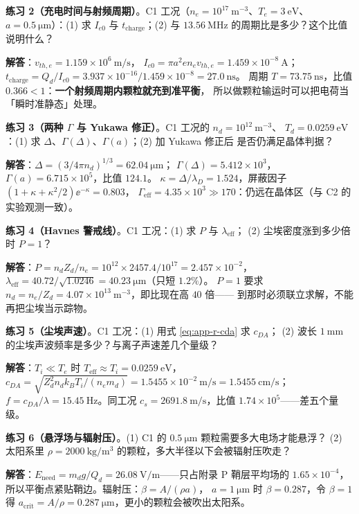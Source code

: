 \textbf{练习 2（充电时间与射频周期）}。C1 工况（$n_e=10^{17}\ \mathrm{m^{-3}}$、$T_e=3\ \mathrm{eV}$、
$a=0.5\ \mathrm{\mu m}$）：(1) 求 $I_{e0}$ 与 $t_{\mathrm{charge}}$；(2) 与 $13.56\ \mathrm{MHz}$
的周期比是多少？这个比值说明什么？

\textbf{解答}：$v_{th,e}=1.159\times10^{6}\ \mathrm{m/s}$，
$I_{e0}=\pi a^2en_ev_{th,e}=1.459\times10^{-8}\ \mathrm{A}$；
$t_{\mathrm{charge}}=Q_d/I_{e0}=3.937\times10^{-16}/1.459\times10^{-8}=27.0\ \mathrm{ns}$。
周期 $T=73.75\ \mathrm{ns}$，比值 $0.366<1$：\textbf{一个射频周期内颗粒就充到准平衡}，
所以做颗粒输运时可以把电荷当「瞬时准静态」处理。

\textbf{练习 3（两种 $\Gamma$ 与 Yukawa 修正）}。C1 工况的 $n_d=10^{12}\ \mathrm{m^{-3}}$、
$T_d=0.0259\ \mathrm{eV}$：(1) 求 $\Delta$、$\Gamma(\Delta)$、$\Gamma(a)$；(2) 加 Yukawa 修正后
是否仍满足晶体判据？

\textbf{解答}：$\Delta=(3/4\pi n_d)^{1/3}=62.04\ \mathrm{\mu m}$；
$\Gamma(\Delta)=5.412\times10^{3}$，$\Gamma(a)=6.715\times10^{5}$，比值 $124.1$。
$\kappa=\Delta/\lambda_D=1.524$，屏蔽因子 $(1+\kappa+\kappa^2/2)\ee^{-\kappa}=0.803$，
$\Gamma_{\mathrm{eff}}=4.35\times10^{3}\gg170$：仍远在晶体区（与 C2 的实验观测一致）。

\textbf{练习 4（Havnes 警戒线）}。C1 工况：(1) 求 $P$ 与 $\lambda_{\mathrm{eff}}$；
(2) 尘埃密度涨到多少倍时 $P=1$？

\textbf{解答}：$P=n_dZ_d/n_e=10^{12}\times2457.4/10^{17}=2.457\times10^{-2}$，
$\lambda_{\mathrm{eff}}=40.72/\sqrt{1.0246}=40.23\ \mathrm{\mu m}$（只短 $1.2\%$）。
$P=1$ 要求 $n_d=n_e/Z_d=4.07\times10^{13}\ \mathrm{m^{-3}}$，即比现在高 $40$ 倍——
到那时必须联立求解，不能再把尘埃当示踪物。

\textbf{练习 5（尘埃声速）}。C1 工况：(1) 用式 \eqref{eq:app-r-cda} 求 $c_{DA}$；
(2) 波长 $1\ \mathrm{mm}$ 的尘埃声波频率是多少？与离子声速差几个量级？

\textbf{解答}：$T_i\ll T_e$ 时 $T_{\mathrm{eff}}\approx T_i=0.0259\ \mathrm{eV}$，
$c_{DA}=\sqrt{Z_d^2n_dk_{\!B}T_i/(n_em_d)}=1.5455\times10^{-2}\ \mathrm{m/s}=1.5455\ \mathrm{cm/s}$；
$f=c_{DA}/\lambda=15.45\ \mathrm{Hz}$。同工况 $c_s=2691.8\ \mathrm{m/s}$，比值
$1.74\times10^{5}$——差五个量级。

\textbf{练习 6（悬浮场与辐射压）}。(1) C1 的 $0.5\ \mathrm{\mu m}$ 颗粒需要多大电场才能悬浮？
(2) 太阳系里 $\rho=2000\ \mathrm{kg/m^3}$ 的颗粒，多大半径以下会被辐射压吹走？

\textbf{解答}：$E_{\mathrm{need}}=m_dg/Q_d=26.08\ \mathrm{V/m}$——只占附录 P 鞘层平均场的
$1.65\times10^{-4}$，所以平衡点紧贴鞘边。辐射压：$\beta=A/(\rho a)$，
$a=1\ \mathrm{\mu m}$ 时 $\beta=0.287$，令 $\beta=1$ 得
$a_{\mathrm{crit}}=A/\rho=0.287\ \mathrm{\mu m}$，更小的颗粒会被吹出太阳系。

